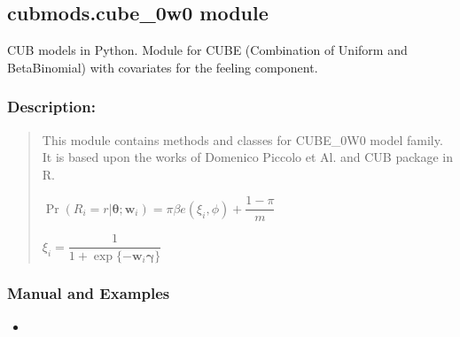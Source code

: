 \documentclass[letterpaper,10pt,english]{sphinxmanual}
\begin{document}
\subsection{cubmods.cube\_0w0 module}
\label{\detokenize{cubmods:module-cubmods.cube_0w0}}\label{\detokenize{cubmods:cubmods-cube-0w0-module}}\label{\detokenize{cubmods:cube0w0-module}}
\sphinxAtStartPar
CUB models in Python.
Module for CUBE (Combination of Uniform
and Beta\sphinxhyphen{}Binomial) with covariates for the feeling component.


\subsubsection{Description:}
\label{\detokenize{cubmods:id247}}\begin{quote}

\sphinxAtStartPar
This module contains methods and classes
for CUBE\_0W0 model family.
It is based upon the works of Domenico
Piccolo et Al. and CUB package in R.

\sphinxAtStartPar
\(\Pr(R_i=r|\pmb{\theta};\pmb w_i) = \pi \beta e(\xi_i,\phi)+\dfrac{1-\pi}{m}\)

\sphinxAtStartPar
\(\xi_i = \dfrac{1}{1+\exp\{-\pmb w_i \pmb \gamma\}}\)
\end{quote}


\subsubsection{Manual and Examples}
\label{\detokenize{cubmods:id248}}\begin{itemize}
\item {} 
\sphinxAtStartPar
{}

\end{itemize}
\end{document}
